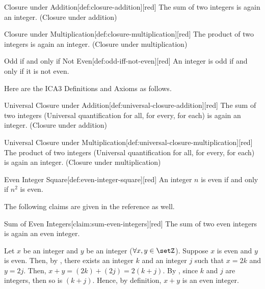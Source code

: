 \begin{define}{Closure under Addition}[def:closure-addition][red]
  The sum of two integers is again an 
  integer. (Closure under addition)
\end{define}

\begin{define}{Closure under Multiplication}[def:closure-multiplication][red]
  The product of two integers is again 
  an integer. (Closure under multiplication)
\end{define}

\begin{define}{Odd if and only if Not Even}[def:odd-iff-not-even][red]
  An integer is odd if and only if it 
  is not even.
\end{define}

Here are the ICA3 Definitions and Axioms as follows.

\begin{define}{Universal Closure under Addition}[def:universal-closure-addition][red]
  The sum of two integers (Universal quantification for all, for every, for each) is again an integer. (Closure under addition)
\end{define}

\begin{define}{Universal Closure under Multiplication}[def:universal-closure-multiplication][red]
  The product of two integers (Universal quantification for all, for every, for each) is again an integer. (Closure under multiplication)
\end{define}

\begin{define}{Even Integer Square}[def:even-integer-square][red]
  An integer $n$ is even if and only if $n^2$ is even.
\end{define}

\newpage

The following claims are given in the reference as well.

\begin{define}{Sum of Even Integers}[claim:sum-even-integers][red]
  The sum of two even integers is again an even integer.
  \begin{subprove}[red]
    Let $x$ be an integer and $y$ be an integer ($\forall x,y \in \setZ$). 
    Suppose $x$ is even and $y$ is even. Then, by , there exists an integer 
    $k$ and an integer $j$ such that $x=2k$ and $y=2j$. Then, 
    $x+y=\left(2k\right)+\left(2j\right)=2\left(k+j\right)$. By , since $k$ and 
    $j$ are integers, then so is $\left(k+j\right)$. Hence, by definition, $x+y$ is an 
    even integer.
  \end{subprove}
\end{define}

